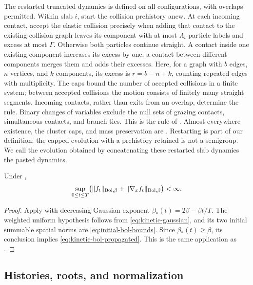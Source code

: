The restarted truncated dynamics is defined on all configurations, with
overlaps permitted. Within slab \(i\), start the collision prehistory
anew. At each incoming contact, accept the elastic collision precisely
when adding that contact to the existing collision graph leaves its
component with at most \(\Lambda_i\) particle labels and excess at most
\(\Gamma\). Otherwise both particles continue straight. A contact
inside one existing component increases its excess by one; a contact
between different components merges them and adds their excesses.
Here, for a graph with \(b\) edges, \(n\) vertices, and \(k\) components,
its excess is \(r=b-n+k\), counting repeated edges with multiplicity.
The caps bound the number of accepted collisions in a finite system;
between accepted collisions the motion consists of finitely many
straight segments. Incoming contacts, rather than exits from an
overlap, determine the rule. Binary changes of variables exclude the
null sets of grazing contacts, simultaneous contacts, and branch ties.
This is the rule of \cite[Definition 4.3, Equation (4.2)]{DHM2025}.
Almost-everywhere existence, the cluster caps, and mass preservation are
\cite[Proposition 4.5]{DHM2025}. Restarting is part of our definition;
the capped evolution with a prehistory retained is not a semigroup.
We call the evolution obtained by concatenating these restarted slab
dynamics the pasted dynamics.

\begin{lemma}\label{lem:kinetic-envelopes}
Under ,
\begin{equation}\label{eq:kinetic-bol-propagated}
 \sup_{0\le t\le T}
 \bigl(\|f_t\|_{\mathrm{Bol},\beta}
       +\|\nabla_x f_t\|_{\mathrm{Bol},\beta}\bigr)<\infty.
\end{equation}
\end{lemma}
\begin{proof}
Apply \cite[Proposition A.1]{DHM2025} with decreasing Gaussian exponent
\(\beta_*(t)=2\beta-\beta t/T\). The weighted uniform hypothesis follows
from \eqref{eq:kinetic-gaussian}, and its two initial summable spatial
norms are \eqref{eq:initial-bol-bounds}. Since
\(\beta_*(t)\ge\beta\), its conclusion implies
\eqref{eq:kinetic-bol-propagated}. This is the same application as
\cite[Equation (1.29)]{DHM2025}.
\end{proof}

\subsection{Histories, roots, and normalization}

